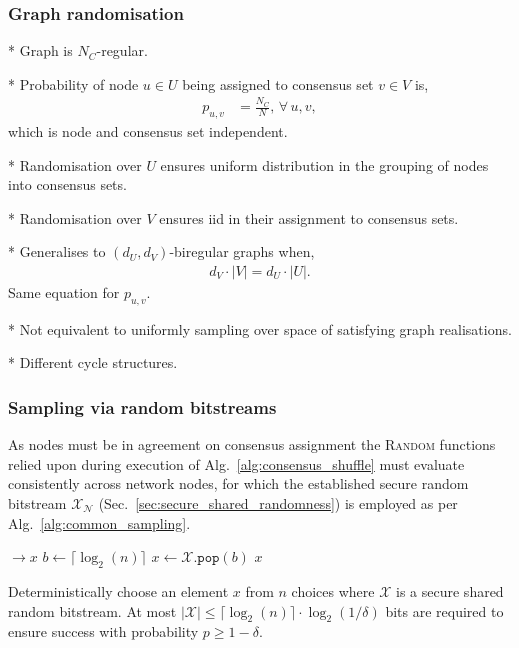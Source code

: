 \subsubsection{Graph randomisation}

* Graph is $N_C$-regular.

* Probability of node $u\in U$ being assigned to consensus set $v\in V$ is,
\begin{align}
	p_{u,v} &= \frac{N_C}{N},\,\forall\,u,v,
\end{align}
which is node and consensus set independent.

* Randomisation over $U$ ensures uniform distribution in the grouping of nodes into consensus sets.

* Randomisation over $V$ ensures iid in their assignment to consensus sets.

* Generalises to $(d_U,d_V)$-biregular graphs when,
\begin{align}
	d_V\cdot |V| = d_U\cdot |U|.
\end{align}
Same equation for $p_{u,v}$.

* Not equivalent to uniformly sampling over space of satisfying graph realisations.

* Different cycle structures.

\subsubsection{Sampling via random bitstreams} \label{sec:random_bitstreams}

As nodes must be in agreement on consensus assignment the \textsc{Random} functions relied upon during execution of Alg.~\ref{alg:consensus_shuffle} must evaluate consistently across network nodes, for which the established secure random bitstream $\mathcal{X}_\mathcal{N}$ (Sec.~\ref{sec:secure_shared_randomness}) is employed as per Alg.~\ref{alg:common_sampling}.

\begin{algorithm}[H]
	\begin{algorithmic}
		 $\to x$
		\Repeat
		\State $b \gets \lceil \log_2(n) \rceil$ 
		\State $x \gets \mathcal{X}.\mathtt{pop}(b)$ 
		 
		\State \Return $x$
		\EndFunction
	\end{algorithmic}
	\caption{Deterministically choose an element $x$ from $n$ choices where $\mathcal{X}$ is a secure shared random bitstream. At most \mbox{$|\mathcal{X}| \leq \lceil \log_2(n) \rceil \cdot \log_2(1/\delta)$} bits are required to ensure success with probability \mbox{$p\geq 1-\delta$}.} \label{alg:common_sampling}
\end{algorithm}

